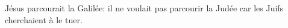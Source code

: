 \encetemps Jésus parcourait la Galilée:
	il ne voulait pas parcourir la Judée car les Juifs cherchaient à le tuer.
